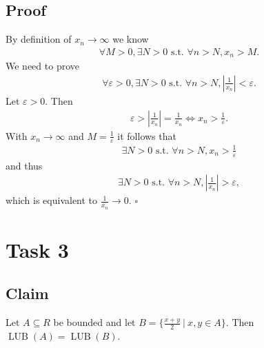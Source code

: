 \documentclass{article}
\newcommand{\st}{\text{ s.t. }}
\DeclareMathOperator{\lub}{\text{LUB}}
\begin{document}
\subsection*{Proof}
By definition of $x_n\to\infty$ we know
\begin{align*}
  \forall M > 0, \exists N> 0 \st \forall n > N, x_n > M.
\end{align*}
We need to prove
\begin{align*}
  \forall \varepsilon > 0, \exists N > 0\st \forall n > N, \left|\frac{1}{x_n}\right|<\varepsilon.
\end{align*}
Let $\varepsilon > 0$. Then
\begin{align*}
  \varepsilon > \left|\frac{1}{x_n}\right| = \frac{1}{x_n} \Leftrightarrow x_n > \frac{1}{\varepsilon}.
\end{align*}
With $x_n\to \infty$ and $M=\frac{1}{\varepsilon}$ it follows that
\begin{align*}
  \exists N > 0 \st \forall n > N, x_n > \frac{1}{\varepsilon}
\end{align*}
and thus
\begin{align*}
  \exists N > 0 \st \forall n > N, \left|\frac{1}{x_n}\right|>\varepsilon,
\end{align*}
which is equivalent to $\frac{1}{x_n}\to 0$. $\square$
\section*{Task 3}
\subsection*{Claim}
Let $A\subseteq R$ be bounded and let $B=\{\frac{x+y}{2}\:|\:x,y\in A\}$. Then $\lub(A)=\lub(B)$.
\end{document}
